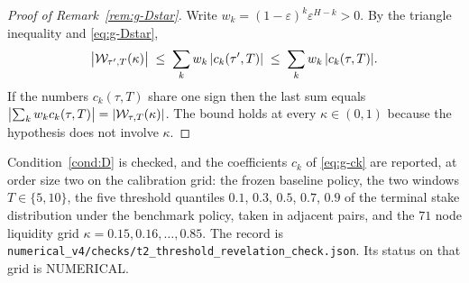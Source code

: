 \begin{proof}[Proof of Remark~\ref{rem:g-Dstar}]
Write $w_k = (1-\varepsilon)^k\varepsilon^{H-k} > 0$. By the triangle inequality and
\eqref{eq:g-Dstar},
\[
\bigl|\mathcal{W}_{\tau',T}(\kappa)\bigr| \;\le\; \sum_{k} w_k\,|c_k(\tau',T)|
\;\le\; \sum_{k} w_k\,|c_k(\tau,T)| .
\]
If the numbers $c_k(\tau,T)$ share one sign then the last sum equals
$\bigl|\sum_k w_k c_k(\tau,T)\bigr| = |\mathcal{W}_{\tau,T}(\kappa)|$. The bound holds at every
$\kappa \in (0,1)$ because the hypothesis does not involve $\kappa$.
\end{proof}

\begin{remark}
\label{rem:g-grid}
Condition~\ref{cond:D} is checked, and the coefficients $c_k$ of \eqref{eq:g-ck} are reported, at
order size two on the calibration grid: the frozen baseline policy, the two windows
$T \in \{5,10\}$, the five threshold quantiles $0.1$, $0.3$, $0.5$, $0.7$, $0.9$ of the
terminal stake distribution under the benchmark policy, taken in adjacent pairs, and the $71$
node liquidity grid $\kappa = 0.15, 0.16, \ldots, 0.85$. The record is
\texttt{numerical\_v4/checks/t2\_threshold\_revelation\_check.json}. Its status on that grid is
NUMERICAL.
\end{remark}
